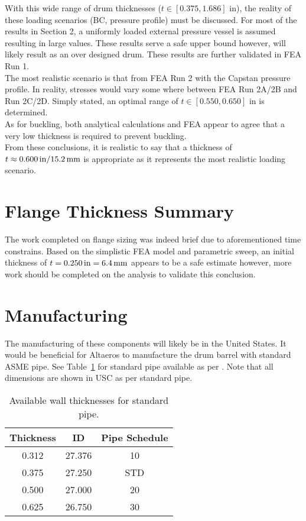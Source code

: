With this wide range of drum thicknesses ($t\in[0.375,1.686]$ in), the reality of these loading scenarios (BC, pressure profile) must be discussed. For most of the results in Section 2, a uniformly loaded external pressure vessel is assumed resulting in large values. These results serve a safe upper bound however, will likely result as an over designed drum. These results are further validated in FEA Run 1.\\

The most realistic scenario is that from FEA Run 2 with the Capstan pressure profile. In reality, stresses would vary some where between FEA Run 2A/2B and Run 2C/2D. Simply stated, an optimal range of $t\in[0.550,0.650]$ in is determined.\\

As for buckling, both analytical calculations and FEA appear to agree that a very low thickness is required to prevent buckling. \\

From these conclusions, it is realistic to say that a thickness of $t \approx 0.600\,\mathrm{in} /\/ 15.2\,\mathrm{mm}$ is appropriate as it represents the most realistic loading scenario. 

\section{Flange Thickness Summary}

The work completed on flange sizing was indeed brief due to aforementioned time constrains. Based on the simplistic FEA model and parametric sweep, an initial thickness of $t=0.250\,\mathrm{in}=6.4\,\mathrm{mm}$ appears to be a safe estimate however, more work should be completed on the analysis to validate this conclusion.

\section{Manufacturing}

The manufacturing of these components will likely be in the United States. It would be beneficial for Altaeros to manufacture the drum barrel with standard ASME pipe. See Table~\ref{table:5_pipe} for standard pipe available as per \cite{PIPEINFO}. Note that all dimensions are shown in USC as per standard pipe.

\begin{table}[H]
	\caption[Available wall thicknesses for standard pipe.]{Available wall thicknesses for standard pipe.\protect\cite{PIPEINFO}}
	\centering
	\begin{tabular}{ccc}
    \textbf{Thickness} & \textbf{ID} & \textbf{Pipe Schedule} \\
    \midrule
    0.312 & 27.376 & 10 \\
    0.375 & 27.250 & STD \\
    0.500 & 27.000 & 20 \\
    0.625 & 26.750 & 30 \\
    \end{tabular}%
	\label{table:5_pipe}
\end{table}

